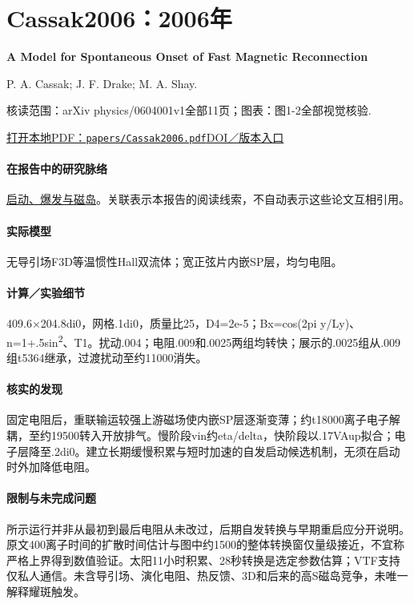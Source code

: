 \documentclass[UTF8,a4paper,11pt,openany,fontset=fandol]{ctexbook}
\begin{document}
\section{Cassak2006：2006年}\label{paper:Cassak2006}

\textbf{A Model for Spontaneous Onset of Fast Magnetic Reconnection}\citep{Cassak2006}\

P. A. Cassak;  J. F. Drake;  M. A. Shay.

\textsf{核读范围：}arXiv physics/0604001v1全部11页；\textsf{图表：}图1-2全部视觉核验.

\href{run:../papers/Cassak2006.pdf}{打开本地PDF：\texttt{papers/Cassak2006.pdf}}\quad\href{https://doi.org/10.1086/505690}{DOI／版本入口}

\paragraph{在报告中的研究脉络}\hyperref[story:onset]{启动、爆发与磁岛}。关联表示本报告的阅读线索，不自动表示这些论文互相引用。

\paragraph{实际模型}无导引场F3D等温惯性Hall双流体；宽正弦片内嵌SP层，均匀电阻。

\paragraph{计算／实验细节}409.6×204.8di0，网格.1di0，质量比25，D4=2e-5；Bx=cos(2pi y/Ly)、n=1+.5sin\textsuperscript{2}、T1。扰动.004；电阻.009和.0025两组均转快；展示的.0025组从.009组t5364继承，过渡扰动至约11000消失。

\paragraph{核实的发现}固定电阻后，重联输运较强上游磁场使内嵌SP层逐渐变薄；约t18000离子电子解耦，至约19500转入开放排气。慢阶段vin约eta/delta，快阶段以.17VAup拟合；电子层降至.2di0。建立长期缓慢积累与短时加速的自发启动候选机制，无须在启动时外加降低电阻。

\paragraph{限制与未完成问题}所示运行并非从最初到最后电阻从未改过，后期自发转换与早期重启应分开说明。原文400离子时间的扩散时间估计与图中约1500的整体转换窗仅量级接近，不宜称严格上界得到数值验证。太阳11小时积累、28秒转换是选定参数估算；VTF支持仅私人通信。未含导引场、演化电阻、热反馈、3D和后来的高S磁岛竞争，未唯一解释耀斑触发。
\end{document}
